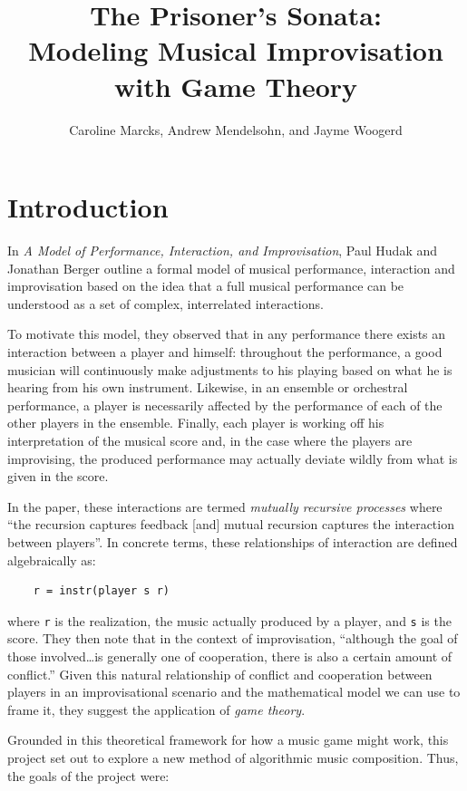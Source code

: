 \documentclass{article}
\title{The Prisoner's Sonata: \\ \large Modeling Musical Improvisation with Game Theory}
\author{Caroline Marcks, Andrew Mendelsohn, and Jayme Woogerd}
\begin{document}
\maketitle


\section{Introduction}

In \emph{A Model of Performance, Interaction, and Improvisation}\cite{hudakberger95}, Paul
Hudak and Jonathan Berger outline a formal model of musical performance, interaction and
improvisation based on the idea that a full musical performance can be
understood as a set of complex, interrelated interactions.

To motivate this model, they observed that in any performance there exists
an interaction between a player and himself: throughout the performance,
a good musician will continuously make adjustments to his playing based
on what he is hearing from his own instrument. Likewise, in an ensemble
or orchestral performance, a player is necessarily affected by the
performance of each of the other players in the ensemble. Finally, each
player is working off his interpretation of the musical score
and, in the case where the players are improvising, the produced
performance may actually deviate wildly from what is given in the score.

In the paper, these interactions are termed \emph{mutually recursive
processes} where ``the recursion captures feedback {[}and{]} mutual
recursion captures the interaction between players''.\cite{hudakberger95} In
concrete terms, these relationships of interaction are defined
algebraically as:

\begin{verbatim}
    r = instr(player s r)
\end{verbatim}


where \texttt{r} is the realization, the music actually produced by a
player, and \texttt{s} is the score.  They then note that in the
context of improvisation, ``although the goal of those involved\ldots{}is generally one of cooperation, there is also a certain amount of
conflict.''\cite{hudakberger95}  Given this natural relationship of conflict and cooperation
between players in an improvisational scenario and the mathematical
model we can use to frame it, they suggest the application of \emph{game
theory}.

Grounded in this theoretical framework for how a music game might
work, this project set out to explore a new method of algorithmic music
composition. Thus, the goals of the project were:
\end{document}
